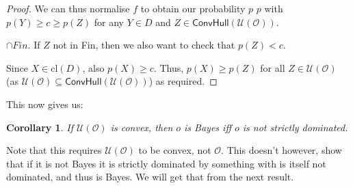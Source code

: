 \documentclass[a4paper]{article}
\newtheorem{corollary}[theorem]{Corollary}
\newcommand\cl{\mathrm{cl}}
\renewcommand\O{\mathcal{O}}
\newcommand\Uwald{\mathcal{U}} %
\newcommand{\Conv}{\mathsf{ConvHull}}
\renewcommand{\geq}{\geqslant}
\newenvironment{CCM rewritten}
{\begingroup\color{blue}} %
{\endgroup}              %
\begin{document}
\begin{proof}
		
		We can thus normalise $f$ to obtain our probability $p$ $p$ with $p(Y)\geq c \geq p(Z)$ for any $Y\in D$ and $Z\in \Conv(\Uwald(\O))$.\begin{infversion}
			$\cap Fin$. If $Z$ not in Fin, then we also want to check that $p(Z)<c$. 
		\end{infversion}
		
		Since $X\in\cl(D)$, also $p(X)\geq c$. Thus, $p(X)\geq p(Z)$ for all $Z\in \Uwald(\O)$ (as $\Uwald(\O)\subseteq \Conv(\Uwald(\O))$) as required.
	\end{proof}
	
		This now gives us:
	\begin{corollary}
		If $\Uwald(\O)$ is convex, then 
		$o$ is Bayes iff $o$ is not strictly dominated.
	\end{corollary}
	Note that this requires $\Uwald(\O)$ to be convex, not $\O$. This doesn't however, show that if it is not Bayes it is strictly dominated by something with is itself not dominated, and thus is Bayes. We will get that from the next result. 
	
	
\end{document}
